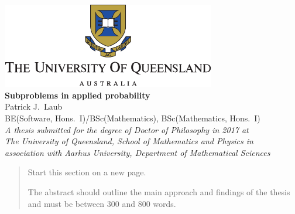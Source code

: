 \begin{titlepage}
\begin{center}
\includegraphics[width=0.70\textwidth]{logo} \\[2cm]

{ \large \bfseries Subproblems in applied probability }\\
Patrick J.\ Laub \\
BE(Software, Hons.\ I)/BSc(Mathematics), BSc(Mathematics, Hons.\ I) \\[7cm]
{\em A thesis submitted for the degree of Doctor of Philosophy in 2017 at\\
The University of Queensland, School of Mathematics and Physics in \\
association with
Aarhus University, Department of Mathematical Sciences} \\

\end{center}
\end{titlepage}


\begin{abstract}
  Start this section on a new page.

  The abstract should outline the main approach and findings of the thesis and
  must be between 300 and 800 words.
\end{abstract}

